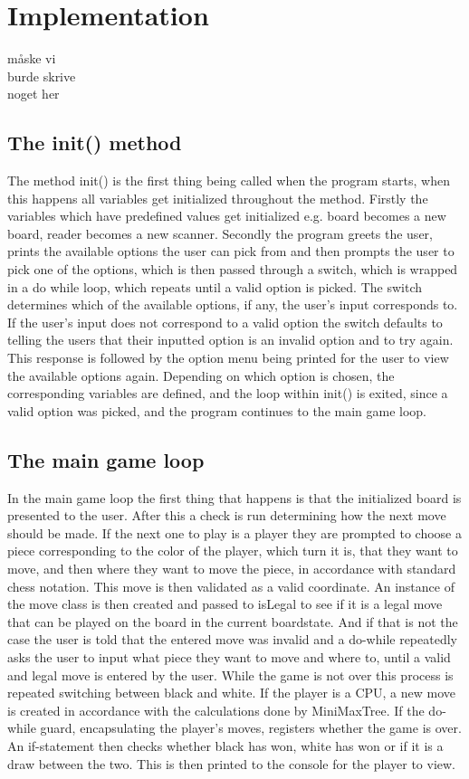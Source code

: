 \documentclass[12pt, a4paper]{article}
\begin{document}
	\section{Implementation}
	måske vi \\ burde skrive \\ noget her
	
	\subsection{The init() method}
	
	The method init() is the first thing being called when the program starts, when this happens all variables get initialized throughout the method. Firstly the variables which have predefined values get initialized e.g. board becomes a new board, reader becomes a new scanner. Secondly the program greets the user, prints the available options the user can pick from and then prompts the user to pick one of the options, which is then passed through a switch, which is wrapped in a do while loop, which repeats until a valid option is picked. The switch determines which of the available options, if any, the user's input corresponds to. If the user’s input does not correspond to a valid option the switch defaults to telling the users that their inputted option is an invalid option and to try again. This response is followed by the option menu being printed for the user to view the available options again. 
	Depending on which option is chosen, the corresponding variables are defined, and the loop within init() is exited, since a valid option was picked, and the program continues to the main game loop.
	
	\subsection{The main game loop}
	
	In the main game loop the first thing that happens is that the initialized board is presented to the user. After this a check is run determining how the next move should be made. If the next one to play is a player they are prompted to choose a piece corresponding to the color of the player, which turn it is, that they want to move, and then where they want to move the piece, in accordance with standard chess notation. This move is then validated as a valid coordinate. An instance of the move class is then created and passed to isLegal to see if it is a legal move that can be played on the board in the current boardstate. And if that is not the case the user is told that the entered move was invalid and a do-while repeatedly asks the user to input what piece they want to move and where to, until a valid and legal move is entered by the user. While the game is not over this process is repeated switching between black and white. If the player is a CPU, a new move is created in accordance with the calculations done by MiniMaxTree. If the do-while guard, encapsulating the player's moves, registers whether the game is over. An if-statement then checks whether black has won, white has won or if it is a draw between the two. This is then printed to the console for the player to view.
	
\end{document}
